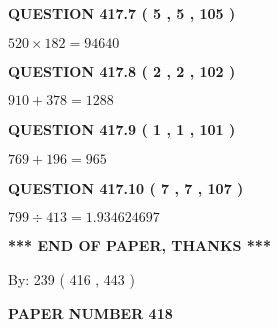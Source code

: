 \documentclass{ctexart}
\begin{document}
  
  
\vspace{0.2in}
  
{\textbf{\Large{QUESTION
417.7 
 ( 5 , 5 , 105 )
}}}
  
  
 
 

$ %
520 \times  %
182=   %
94640$
 
 
  
\vspace{0.2in}
  
{\textbf{\Large{QUESTION
417.8 
 ( 2 , 2 , 102 )
}}}
  
  
 
 

$ %
910 +  %
378=   %
1288$
 
 
  
\vspace{0.2in}
  
{\textbf{\Large{QUESTION
417.9 
 ( 1 , 1 , 101 )
}}}
  
  
 
 

$ %
769 +  %
196=   %
965$
 
 
  
\vspace{0.2in}
  
{\textbf{\Large{QUESTION
417.10 
 ( 7 , 7 , 107 )
}}}
  
  
 
 

$ %
799 \div  %
413=   %
1.934624697$
 
 
   
   
 \vspace{0.2in}
 
   
   
   
   
\vspace{1.0in} 
{\textbf{\large{ *** END OF PAPER, THANKS *** }}} 
   
   
\hspace{1.0in} By: 
 239 ( 416 ,  443 )
   
   
   
   
\newpage 
\setcounter{page}{ 
   418001 } 
   
   
   
   
 {\textbf{ \Large{ PAPER NUMBER  418  }}}
   
   
\vspace{0.2in}
   
   
   
\end{document}
